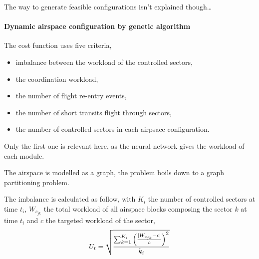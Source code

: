 \documentclass{article}
\begin{document}
The way to generate feasible configurations isn't explained though\dots



\paragraph{Dynamic airspace configuration by genetic
  algorithm\cite{sergeeva2017dynamic}}
The cost function uses five criteria,
\begin{itemize}
  \item imbalance between the workload of the controlled sectors,
  \item the coordination workload,
  \item the number of flight re-entry events,
  \item the number of short transits flight through sectors,
  \item the number of controlled sectors in each airpsace configuration.
\end{itemize}
Only the first one is relevant here, as the neural network gives the workload of
each module.

The airspace is modelled as a graph, the problem boils down to a graph
partitioning problem.

The imbalance is calculated as follow, with \(K_i\) the number of controlled
sectors at time \(t_i\), \(W_{c_{jk}}\) the total workload of all airspace
blocks composing the sector \(k\) at time \(t_i\) and \(c\) the targeted
workload of the sector,
\[
  U_t = \sqrt{%
    \frac{%
      \sum_{k=1}^{K_i} {\left( \frac{|W_{c_{jk}} - c|}{c} \right)}^2
    }{k_i}
  }
\]





\end{document}
